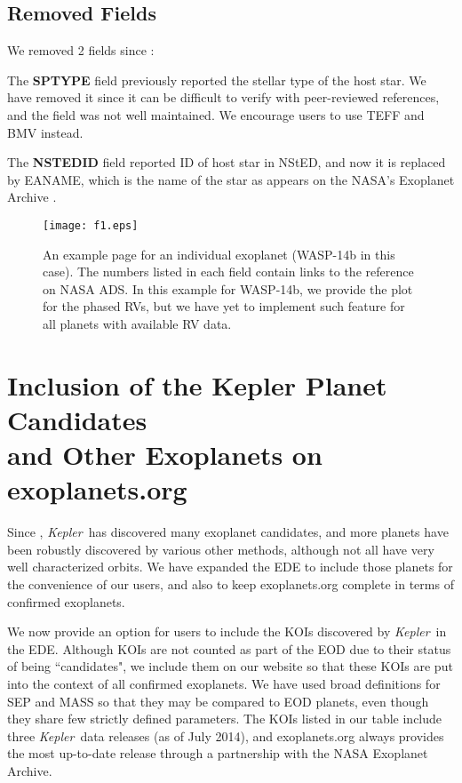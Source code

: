 \documentclass[11pt,preprint]{aastex}
\def\kepler{\textit{Kepler}}
\begin{document}
\begin{CJK*}{UTF8}{gbsn}
\subsection{Removed Fields}\label{sec:removed}

We removed 2 fields since \cite{Wright2011}:

The {\bf SPTYPE} field previously reported the stellar type of the host
star.  We have removed it since it can be difficult to verify with
peer-reviewed references, and the field was not well maintained.  We encourage users
to use TEFF and BMV instead.

The {\bf NSTEDID} field reported ID of host star in NStED, and now it is
replaced by EANAME, which is the name of the star as appears on the
NASA's Exoplanet Archive \citep{Akeson2013}. 


\begin{figure}[!htb]
\centering
\texttt{[image: f1.eps]}
\caption{An example page for an individual exoplanet (WASP-14b in this
  case). The numbers listed in each field contain links to the
  reference on NASA ADS. In this example for WASP-14b, we provide the plot
  for the phased RVs, but we have yet to implement such feature for all
  planets with available RV data.}
\label{fig:individual}
\end{figure}


\section{Inclusion of the Kepler Planet Candidates \\
  and Other Exoplanets on exoplanets.org}\label{sec:kepler}

Since \cite{Wright2011}, \kepler\ has discovered many exoplanet
candidates, and more planets have been robustly discovered by various
other methods, although not all have very well characterized orbits.  We have
expanded the EDE to include those planets for the convenience of
our users, and also to keep exoplanets.org complete in terms of confirmed
exoplanets.

We now provide an option for users to include the KOIs discovered by \kepler\ in the
EDE. Although KOIs are not counted as part of the EOD due to their
status of being ``candidates", we include them on our website so that
these KOIs are put into the context of all confirmed exoplanets. We
have used broad definitions for SEP and MASS so that they may be
compared to EOD planets, even though they share few strictly defined parameters.  The
KOIs listed in our table include three \kepler\ data releases (as of
July 2014), and exoplanets.org always provides the most up-to-date
release through a partnership with the NASA Exoplanet Archive.  


\end{CJK*}
\end{document}
